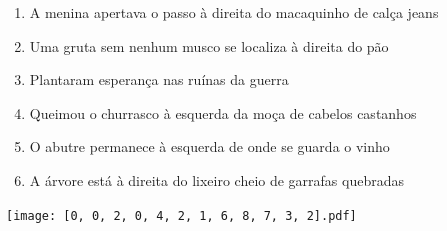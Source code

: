\documentclass[12pt]{article}
\begin{document}
		 

\pagebreak


	\begin{enumerate}
		  \sffamily %
		  \large %


\vfill \item
A menina apertava o passo	%
à direita
do macaquinho de calça jeans	%

\vfill \item
Uma gruta sem nenhum musco se localiza	%
à direita
do pão	%

\vfill \item
Plantaram esperança	%
nas ruínas da guerra	%

\vfill \item
Queimou o churrasco	%
à esquerda
da moça de cabelos castanhos	%

\vfill \item
O abutre permanece	%
à esquerda
de onde se guarda o vinho	%

\vfill \item
A árvore está	%
à direita
do lixeiro cheio de garrafas quebradas	%
	\end{enumerate}
		  
		  \hfill

		  \vfill

\texttt{[image: [0, 0, 2, 0, 4, 2, 1, 6, 8, 7, 3, 2].pdf]}


	\hfill	  	  


\pagebreak			
\end{document}
